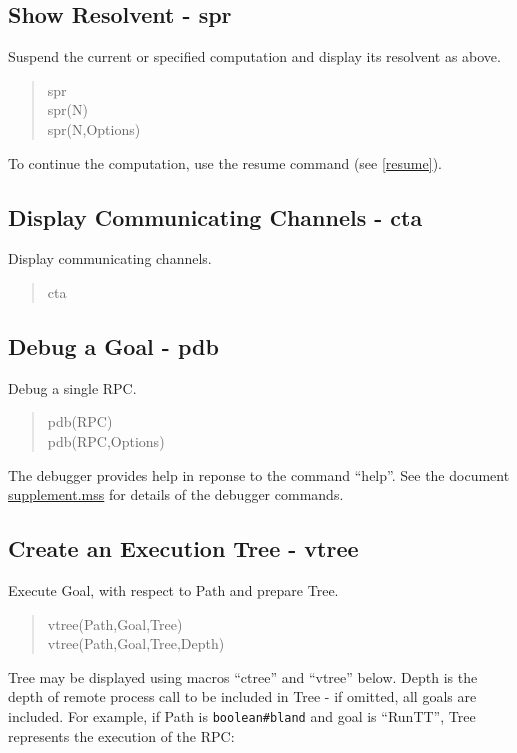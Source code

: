 \subsection{Show Resolvent - spr}
\label{spr}

Suspend the current or specified computation and display its resolvent
as above.

\begin{verse}
   spr \\
   spr(N) \\
   spr(N,Options)
\end{verse}

\noindent
To continue the computation, use the resume command
(see \ref{resume}).

\subsection{Display Communicating Channels - cta}
\label{cta}

Display communicating channels.

\label{cta}
\begin{verse}
    cta
\end{verse}

\subsection{Debug a Goal - pdb}

Debug a single RPC.

\begin{verse}
    pdb(RPC) \\
    pdb(RPC,Options)
\end{verse}

\noindent
The debugger provides help in reponse to the command ``help''.
See the document \underline{supplement.mss} for details of the debugger
commands.

\subsection{Create an Execution Tree - vtree}

Execute Goal, with respect to Path and prepare Tree.

\begin{verse}
    vtree(Path,Goal,Tree) \\
    vtree(Path,Goal,Tree,Depth)
\end{verse}

\noindent
Tree may be displayed using macros ``ctree'' and ``vtree'' below.
Depth is the depth of remote process call to be included in Tree -
if omitted, all goals are included.
For example, if Path is \verb+boolean#bland+
and goal is ``RunTT'', Tree represents the execution of the RPC:

